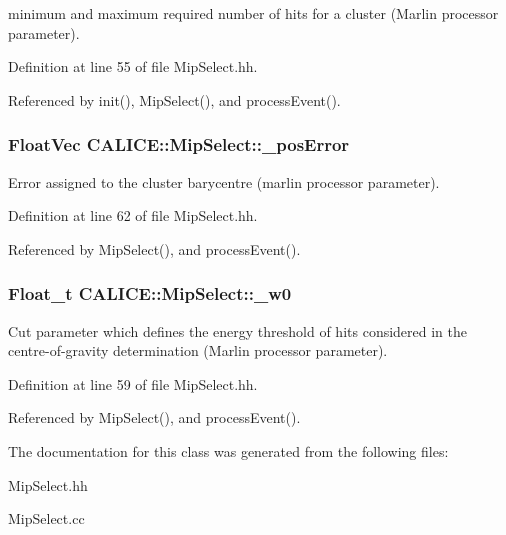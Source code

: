 minimum and maximum required number of hits for a cluster (Marlin processor parameter). 

Definition at line 55 of file MipSelect.hh.

Referenced by init(), MipSelect(), and processEvent().
\subsubsection[{\_\-posError}]{\setlength{\rightskip}{0pt plus 5cm}FloatVec {\bf CALICE::MipSelect::\_\-posError}\hspace{0.3cm}{\ttfamily  [protected]}}\label{classCALICE_1_1MipSelect_a47f1821c1518e00d403d026c5b1eb848}


Error assigned to the cluster barycentre (marlin processor parameter). 

Definition at line 62 of file MipSelect.hh.

Referenced by MipSelect(), and processEvent().
\subsubsection[{\_\-w0}]{\setlength{\rightskip}{0pt plus 5cm}Float\_\-t {\bf CALICE::MipSelect::\_\-w0}\hspace{0.3cm}{\ttfamily  [protected]}}\label{classCALICE_1_1MipSelect_ae601de1184f473e69224607d827436a3}


Cut parameter which defines the energy threshold of hits considered in the centre-\/of-\/gravity determination (Marlin processor parameter). 

Definition at line 59 of file MipSelect.hh.

Referenced by MipSelect(), and processEvent().

The documentation for this class was generated from the following files:\begin{DoxyCompactItemize}
\item 
MipSelect.hh\item 
MipSelect.cc\end{DoxyCompactItemize}
